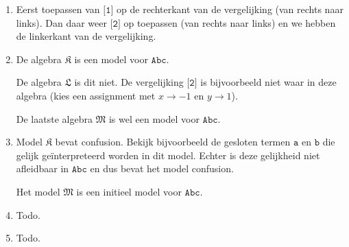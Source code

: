 \documentclass[a4paper,11pt]{article}
\begin{document}
\begin{enumerate}

\item %

Eerst toepassen van $\texttt{[1]}$ op de rechterkant van de vergelijking (van
rechts naar links). Dan daar weer $\texttt{[2]}$ op toepassen (van rechts naar
links) en we hebben de linkerkant van de vergelijking.

\item %

De algebra $\mathfrak{K}$ is een model voor $\texttt{Abc}$.

De algebra $\mathfrak{L}$ is dit niet. De vergelijking $\texttt{[2]}$ is
bijvoorbeeld niet waar in deze algebra (kies een assignment met $x \rightarrow
-1$ en $y \rightarrow 1$).

De laatste algebra $\mathfrak{M}$ is wel een model voor $\texttt{Abc}$.

\item %

Model $\mathfrak{K}$ bevat confusion. Bekijk bijvoorbeeld de gesloten termen
$\texttt{a}$ en $\texttt{b}$ die gelijk ge\"interpreteerd worden in dit
model. Echter is deze gelijkheid niet afleidbaar in $\texttt{Abc}$ en dus
bevat het model confusion.

Het model $\mathfrak{M}$ is een initieel model voor $\texttt{Abc}$.

\item %

Todo.

\item %

Todo.

\end{enumerate}
\end{document}
